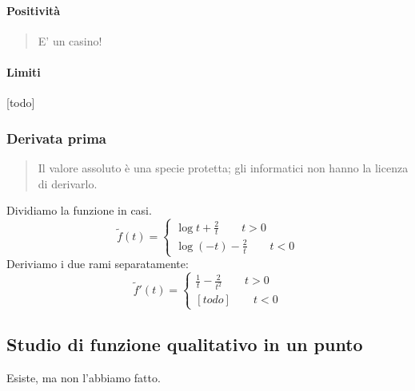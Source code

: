 \documentclass{article}
\begin{document}
\paragraph{Positività}
\begin{quote}
    E' un casino!
\end{quote}

\paragraph{Limiti}
[todo]

\subsubsection{Derivata prima}
\begin{quote}
    Il valore assoluto è una specie protetta; gli informatici non hanno la licenza di derivarlo.
\end{quote}
Dividiamo la funzione in casi.
\[\tilde{f}(t) = \begin{cases}
    \log t + \frac{2}{t} \qquad t > 0\\
    \log (-t) - \frac{2}{t} \qquad t < 0
\end{cases}\]
Deriviamo i due rami separatamente:
\[\tilde{f}'(t) = \begin{cases}
    \frac{1}{t} - \frac{2}{t^2} \qquad t > 0\\
    [todo] \qquad t < 0
\end{cases}\]

\subsection{Studio di funzione qualitativo in un punto}
Esiste, ma non l'abbiamo fatto.
\end{document}
